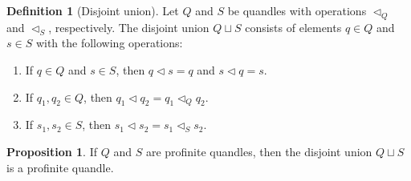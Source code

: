 \documentclass[reqno,dvipsnames]{amsart}
\newcommand{\tl}{\triangleleft}
\theoremstyle{definition}
\newtheorem{proposition}[theorem]{Proposition}
\newtheorem{definition}[theorem]{Definition}
\begin{document}
{\begin{definition}[Disjoint union]
Let $Q$ and $S$ be quandles with operations $\tl_Q$ and $\tl_S$, respectively. The disjoint union $Q\sqcup S$ consists of elements $q\in Q$ and $s\in S$ with the following operations:
\begin{enumerate}[label=(\roman*)]
    \item If $q\in Q$ and $s\in S$, then $q\tl s=q$ and $s\tl q=s$.
    \item If $q_1,q_2\in Q$, then $q_1\tl q_2=q_1\tl_Qq_2$.
    \item If $s_1,s_2\in S$, then $s_1\tl s_2=s_1\tl_Ss_2$.
\end{enumerate}
\end{definition}

\begin{proposition}
If $Q$ and $S$ are profinite quandles, then the disjoint union $Q\sqcup S$ is a profinite quandle.
\end{proposition}

}
\end{document}
